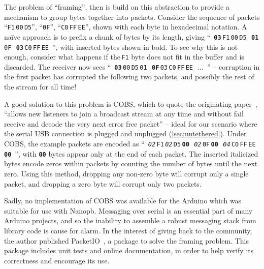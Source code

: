 \documentclass[main.tex]{subfiles}
\begin{document}
		The problem of \enquote{framing}, then is build on this abstraction to provide a mechanism to group bytes together into packets. Consider the sequence of packets
		\enquote{\texttt{F1}\,\texttt{00}\,\texttt{D5}},
		\enquote{\texttt{0F}},
		\enquote{\texttt{C0}\,\texttt{FF}\,\texttt{EE}}, shown with each byte in hexadecimal notation.
		A na\"ive approach is to prefix a chunk of bytes by its length, giving
		\mbox{\enquote{%
			\textbf{\texttt{03}}\,\texttt{F1}\,\texttt{00}\,\texttt{D5}\,%
			\textbf{\texttt{01}}\,\texttt{0F}\,%
			\textbf{\texttt{03}}\,\texttt{C0}\,\texttt{FF}\,\texttt{EE}%
		}}, with inserted bytes shown in bold.
		To see why this is not enough, consider what happens if the\,\texttt{F1} byte does not fit in the buffer and is discarded. The receiver now sees \mbox{\enquote{%
			\textbf{\texttt{03}}\,\texttt{00}\,\texttt{D5}\,\texttt{01}\,%
			\textbf{\texttt{0F}}\,\texttt{03}\,\texttt{C0}\,\texttt{FF}\,\texttt{EE}\,%
			...%
		}} -- corruption in the first packet has corrupted the following two packets, and possibly the rest of the stream for all time!

		A good solution to this problem is COBS, which to quote the originating paper~\cite{cobs}, \enquote{allows new listeners to join a broadcast stream at any time and without fail receive and decode the very next error free packet} -- ideal for our scenario where the serial USB connection is plugged and unplugged (\cref{sec:untethered}). Under COBS, the example packets are encoded as
		\mbox{\enquote{%
			\textit{\texttt{02}}\,\texttt{F1}\,\textit{\texttt{02}}\,\texttt{D5}\,\textbf{\texttt{00}}\,%
			\textit{\texttt{02}}\,\texttt{0F}\,\textbf{\texttt{00}}\,%
			\textit{\texttt{04}}\,\texttt{C0}\,\texttt{FF}\,\texttt{EE}\,\textbf{\texttt{00}}%
		}}, with \textbf{\texttt{00}} bytes appear only at the end of each packet.
		The inserted italicized bytes encode zeros within packets by counting the number of bytes until the next zero.
		Using this method, dropping any non-zero byte will corrupt only a single packet, and dropping a zero byte will corrupt only two packets.

		Sadly, no implementation of COBS was available for the Arduino which was suitable for use with Nanopb\footnotemark.
		Messaging over serial is an essential part of many Arduino projects, and so the inability to assemble a robust messaging stack from library code is cause for alarm.
		In the interest of giving back to the community, the author published PacketIO~\cite{packetio}, a package to solve the framing problem.
		This package includes unit tests and online documentation, in order to help verify its correctness and encourage its use.
\end{document}
